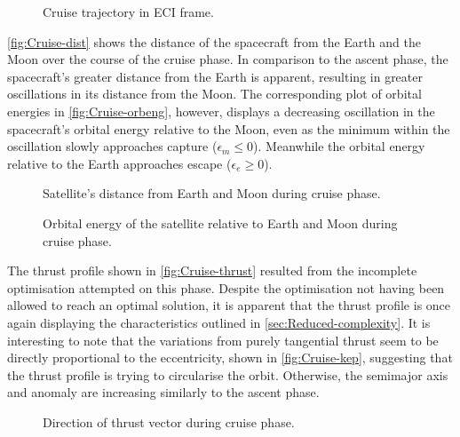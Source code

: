 \begin{figure}
\caption{Cruise trajectory in ECI frame.} \label{fig:Cruise-3D}
\centering
\def\svgwidth{\figurewidth}

\end{figure}

\autoref{fig:Cruise-dist} shows the distance of the spacecraft from the Earth and the Moon over the course of the cruise phase. In comparison to the ascent phase, the spacecraft's greater distance from the Earth is apparent, resulting in greater oscillations in its distance from the Moon. The corresponding plot of orbital energies in \autoref{fig:Cruise-orbeng}, however, displays a decreasing oscillation in the spacecraft's orbital energy relative to the Moon, even as the minimum within the oscillation slowly approaches capture ($\epsilon_m\le0$). Meanwhile the orbital energy relative to the Earth approaches escape ($\epsilon_e\ge0$). 

\begin{figure}
\caption{Satellite's distance from Earth and Moon during cruise phase.} \label{fig:Cruise-dist}
\centering
\def\svgwidth{\figurewidth}

\end{figure}

\begin{figure}
\caption{Orbital energy of the satellite relative to Earth and Moon during cruise phase.} \label{fig:Cruise-orbeng}
\centering
\def\svgwidth{\figurewidth}

\end{figure}

The thrust profile shown in \autoref{fig:Cruise-thrust} resulted from the incomplete optimisation attempted on this phase. Despite the optimisation not having been allowed to reach an optimal solution, it is apparent that the thrust profile is once again displaying the characteristics outlined in \autoref{sec:Reduced-complexity}. It is interesting to note that the variations from purely tangential thrust seem to be directly proportional to the eccentricity, shown in \autoref{fig:Cruise-kep}, suggesting that the thrust profile is trying to circularise the orbit. Otherwise, the semimajor axis and anomaly are increasing similarly to the ascent phase.

\begin{figure}
\caption{Direction of thrust vector during cruise phase.} \label{fig:Cruise-thrust}
\centering
\def\svgwidth{\figurewidth}

\end{figure}

